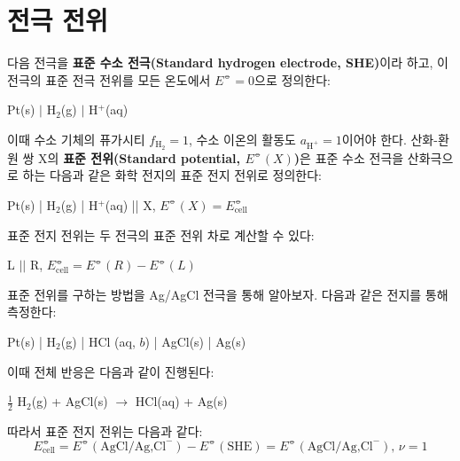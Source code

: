         \section{전극 전위}
        \hspace{\parindent} 다음 전극을 \textbf{표준 수소 전극(Standard hydrogen electrode, SHE)}이라 하고, 이 전극의 표준 전극 전위를 모든 온도에서 $E^\circlehbar=0$으로 정의한다:
        \begin{defn}[표준 수소 전극]
        \begin{center}
            Pt(s) $\vert$ H$_2$(g) $\vert$ H$^+$(aq)
        \end{center}
        \end{defn}
        이때 수소 기체의 퓨가시티 $f_{\mathrm{H}_2} = 1$, 수소 이온의 활동도 $a_{\mathrm{H}^{+}}=1$이어야 한다. 
        산화-환원 쌍 X의 \textbf{표준 전위(Standard potential, $E^\circlehbar\left(X\right)$)}은 
        표준 수소 전극을 산화극으로 하는 다음과 같은 화학 전지의 표준 전지 전위로 정의한다:
        \begin{defn}[표준 전위]
        \begin{center}
            Pt(s) | H$_2$(g) | H$^{+}$(aq) || X, $E^\circlehbar\left(X\right)=E^\circlehbar_\mathrm{cell}$
        \end{center}
        \end{defn}
        표준 전지 전위는 두 전극의 표준 전위 차로 계산할 수 있다:
        \begin{obs}[표준 전지 전위]
        \begin{center}
            L $\vert \vert$ R, $E^\circlehbar_\mathrm{cell}=E^\circlehbar\left(R\right) - E^\circlehbar\left(L\right)$
        \end{center}
        \end{obs}
        \par 표준 전위를 구하는 방법을 Ag/AgCl 전극을 통해 알아보자. 다음과 같은 전지를 통해 측정한다:
        \begin{center}
            Pt(s) | H$_2$(g) | HCl (aq, $b$) | AgCl(s) | Ag(s)
        \end{center}
        이때 전체 반응은 다음과 같이 진행된다:
        \begin{center}
            $\displaystyle\frac{1}{2}$ H$_2$(g) + AgCl(s) $\rightarrow$ HCl(aq) + Ag(s)
        \end{center}
        따라서 표준 전지 전위는 다음과 같다:
        \begin{equation*}
            E^\circlehbar_\mathrm{cell}=E^\circlehbar\left(\text{AgCl/Ag,Cl}^{-}\right)-E^\circlehbar\left(\text{SHE}\right)=E^\circlehbar\left(\text{AgCl/Ag,Cl}^{-}\right),\, \nu=1
        \end{equation*}
